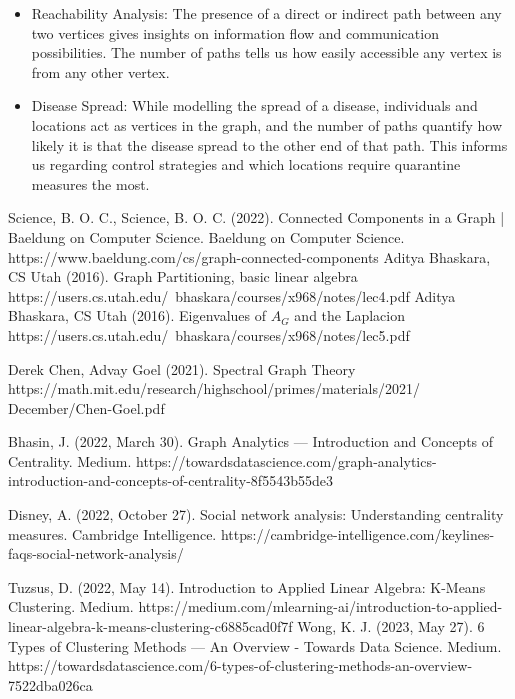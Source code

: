 \documentclass[12pt, a4paper]{article}
\begin{document}
\begin{flushleft}
\begin{itemize}
        \item Reachability Analysis: The presence of a direct or indirect path between any two vertices gives insights on information flow and communication possibilities. The number of paths tells us how easily accessible any vertex is from any other vertex.

        \item Disease Spread: While modelling the spread of a disease, individuals and locations act as vertices in the graph, and the number of paths quantify how likely it is that the disease spread to the other end of that path. This informs us regarding control strategies and which locations require quarantine measures the most.
      \end{itemize}

    \end{flushleft} 

    \begin{thebibliography}{9}
    Science, B. O. C., Science, B. O. C. (2022). Connected Components in a Graph | Baeldung on Computer Science. Baeldung on Computer Science. https://www.baeldung.com/cs/graph-connected-components
    Aditya Bhaskara, CS Utah (2016). Graph Partitioning, basic linear algebra https://users.cs.utah.edu/~bhaskara/courses/x968/notes/lec4.pdf
    Aditya Bhaskara, CS Utah (2016). Eigenvalues of $A_G$ and the Laplacion https://users.cs.utah.edu/~bhaskara/courses/x968/notes/lec5.pdf

    Derek Chen, Advay Goel (2021). Spectral Graph Theory https://math.mit.edu/research/highschool/primes/materials/2021/\\December/Chen-Goel.pdf

    Bhasin, J. (2022, March 30). Graph Analytics — Introduction and Concepts of Centrality. Medium. https://towardsdatascience.com/graph-analytics-introduction-and-concepts-of-centrality-8f5543b55de3

    Disney, A. (2022, October 27). Social network analysis: Understanding centrality measures. Cambridge Intelligence. https://cambridge-intelligence.com/keylines-faqs-social-network-analysis/

    Tuzsus, D. (2022, May 14). Introduction to Applied Linear Algebra: K-Means Clustering. Medium. https://medium.com/mlearning-ai/introduction-to-applied-linear-algebra-k-means-clustering-c6885cad0f7f
    Wong, K. J. (2023, May 27). 6 Types of Clustering Methods — An Overview - Towards Data Science. Medium. https://towardsdatascience.com/6-types-of-clustering-methods-an-overview-7522dba026ca

    \end{thebibliography}
\end{document}
